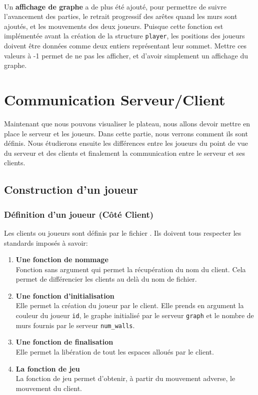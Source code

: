 \documentclass[a4paper]{article}
\begin{document}
\paragraph{}
Un \textbf{affichage de graphe} a de plus été ajouté, pour permettre de suivre l'avancement des parties, le retrait progressif des arêtes quand les murs sont ajoutés, et les mouvements des deux joueurs. Puisque cette fonction est implémentée avant la création de la structure \texttt{player}, les positions des joueurs doivent être données comme deux entiers représentant leur sommet. Mettre ces valeurs à -1 permet de ne pas les afficher, et d'avoir simplement un affichage du graphe.

\clearpage
\section{Communication Serveur/Client}

Maintenant que nous pouvons visualiser le plateau, nous allons devoir mettre en place le serveur et les joueurs.
Dans cette partie, nous verrons comment ils sont définis. Nous étudierons ensuite les différences entre les joueurs du point de vue du serveur et des clients et finalement la communication entre le serveur et ses clients.

\subsection{Construction d'un joueur}

\subsubsection{Définition d'un joueur (Côté Client)}

Les clients ou joueurs sont définis par le fichier . Ils doivent tous respecter les standards imposés à savoir: \\

\begin{enumerate}
    \item \textbf{Une fonction de nommage} \\
Fonction sans argument qui permet la récupération du nom du client. Cela permet de différencier les clients au delà du nom de fichier.
    \item \textbf{Une fonction d'initialisation} \\
Elle permet la création du joueur par le client. Elle prends en argument la couleur du joueur \texttt{id}, le graphe initialisé par le serveur \texttt{graph} et le nombre de murs fournis par le serveur \texttt{num\_walls}.
    \item \textbf{Une fonction de finalisation} \\
Elle permet la libération de tout les espaces alloués par le client.
    \item \textbf{La fonction de jeu} \\
La fonction de jeu permet d'obtenir, à partir du mouvement adverse, le mouvement du client. \\
\end{enumerate}
\end{document}
